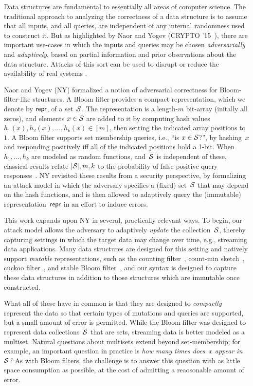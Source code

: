 Data structures are fundamental to essentially all areas of computer science.
The traditional approach to analyzing the correctness of a data structure is to
assume that all inputs, and all queries, are independent of any internal
randomness used to construct it.  But as highlighted by Naor and
Yogev (CRYPTO '15~\cite{naor2015bloom}), there are important use-cases in which the inputs
and queries may be chosen \emph{adversarially} and \emph{adaptively}, based on
partial information and prior observations about the data structure. Attacks of
this sort can be used to disrupt or reduce the availability of real systems
\cite{crosby2003denial,gerbet2015power,lipton1993clocked}.

Naor and Yogev (NY) formalized a notion of adversarial correctness for
Bloom-filter-like structures. A Bloom filter provides a compact representation,
which we denote by $\mathsf{repr}$, of a set~$\mathcal{S}$. The representation is a length-$m$
bit-array (initally all zeros), and elements $x \in \mathcal{S}$ are added to it by
computing hash values $h_1(x),h_2(x),\ldots,h_k(x)\in [m]$, then setting the
indicated array positions to~$1$.  A Bloom filter supports set membership
queries, i.e., ``is $x\in\mathcal{S}$?'', by hashing~$x$ and responding positively iff
all of the indicated positions hold a 1-bit.  When $h_1,\ldots,h_k$ are modeled
as random functions, and~$\mathcal{S}$ is independent of these, classical results
relate $|\mathcal{S}|,m,k$ to the probability of false-positive query
responses~\cite{broder2004network,kirsch2006less}.
%
NY revisited these results from a security perspective, by
formalizing an attack model in which the adversary specifies a
(fixed) set~$\mathcal{S}$ that may
depend on the hash functions, and is then allowed to adaptively query the
(immutable) representation~$\mathsf{repr}$ in an effort to induce errors.

This work expands upon NY in several, practically relevant ways.  To begin, our
attack model allows the adversary to adaptively \emph{update} the
collection~$\mathcal{S}$, thereby capturing settings in which the target data may
change over time, e.g., streaming data applications. Many data structures are
designed for this setting and natively support \emph{mutable} representations,
such as the counting filter~\cite{fan2000summary}, count-min
sketch~\cite{cormode2005improved}, cuckoo filter~\cite{fan2014cuckoo}, and
stable Bloom filter~\cite{deng2006approximately}, and our syntax is designed to
capture these data structures in addition to those structures which are
immutable once constructed.

What all of these have in common is that they are designed to \emph{compactly}
represent the data so that certain types of mutations and queries are supported,
but a small amount of error is permitted.
%
While the Bloom filter was designed to represent data collections~$\mathcal{S}$
that are sets, streaming data is better modeled as a multiset.  Natural
questions about multisets extend beyond set-membership; for example, an
important question in practice is \emph{how many times does~$x$ appear
in~$\mathcal{S}$?} As with Bloom filters, the challenge is to answer this question with
as little space consumption as possible, at the cost of admitting a reaosonable
amount of error.

